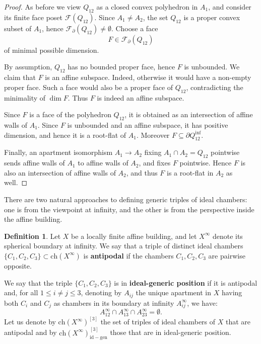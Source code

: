 \documentclass[11pt]{amsart}
\newcommand{\idgen}{\Ch(X^\infty)_{\mathrm{id-gen}}^{[3]}}
\newcommand{\Ch}{\mathrm{ch}}
\theoremstyle{plain}
\theoremstyle{definition}
\newtheorem{Def}[thm]{Definition}
\theoremstyle{remark}
\begin{document}
		\begin{proof}
			As before we view \(Q_{12}\) as a closed convex polyhedron in \(A_1\), and consider its	finite face poset \(\mathscr F(Q_{12})\). Since \(A_1\neq A_2\), the set \(Q_{12}\) is a proper convex subset of \(A_1\), hence \(\mathscr F_\partial(Q_{12})\neq\emptyset\). Choose a face
			\[
			F\in \mathscr F_\partial(Q_{12})
			\]
			of minimal possible dimension.
			
			By assumption, \(Q_{12}\) has no bounded proper face, hence \(F\) is unbounded. We claim that \(F\) is an affine subspace. Indeed, otherwise it would have a non-empty proper face. Such a face would also be a proper face of \(Q_{12}\), contradicting the minimality of \(\dim F\). Thus \(F\) is indeed an affine subspace.
			
			Since \(F\) is a face of the polyhedron \(Q_{12}\), it is obtained as an intersection of affine walls of \(A_1\). Since \(F\) is unbounded and an affine subspace, it has positive dimension, and hence it is a root-flat of \(A_1\). Moreover \(F\subseteq \partial Q_{12}^{\mathrm{inf}}\).
			
			Finally, an apartment isomorphism \(A_1\to A_2\) fixing \(A_1\cap A_2=Q_{12}\) pointwise sends affine walls of \(A_1\) to affine walls of \(A_2\), and fixes \(F\) pointwise. Hence \(F\) is also an intersection of affine walls of \(A_2\), and thus \(F\) is a root-flat in \(A_2\) as well.
	\end{proof}
	
	There are two natural approaches to defining generic triples of ideal chambers: one is from the viewpoint at infinity, and the other is from the perspective inside the affine building.
	
	\begin{Def}\label{def generic}
		Let \( X \) be a locally finite affine building, and let \( X^\infty \) denote its spherical boundary at infinity. We say that a triple of distinct ideal chambers \( \{C_1, C_2, C_3\} \subset \Ch(X^\infty) \) is \textbf{antipodal} if the chambers \( C_1, C_2, C_3 \) are pairwise opposite.
		
		We say that the triple \( \{C_1, C_2, C_3\} \) is in \textbf{ideal-generic position} if it is antipodal and, for all \( 1 \leq i \neq j \leq 3 \), denoting by \( A_{ij} \) the unique apartment in $X$ having both  \( C_i \) and \( C_j \) as chambers in its boundary at infinity \(A_{ij}^{\infty} \), we have:
		\[
		A_{12}^{\infty} \cap  A_{13}^{\infty} \cap A_{23}^{\infty} = \emptyset.
		\]
		Let us denote by $\Ch(X^\infty)^{[3]}$ the set of triples of ideal chambers of $X$ that are antipodal and by $\idgen$ those that are in ideal-generic position.
	\end{Def}
	
\end{document}
